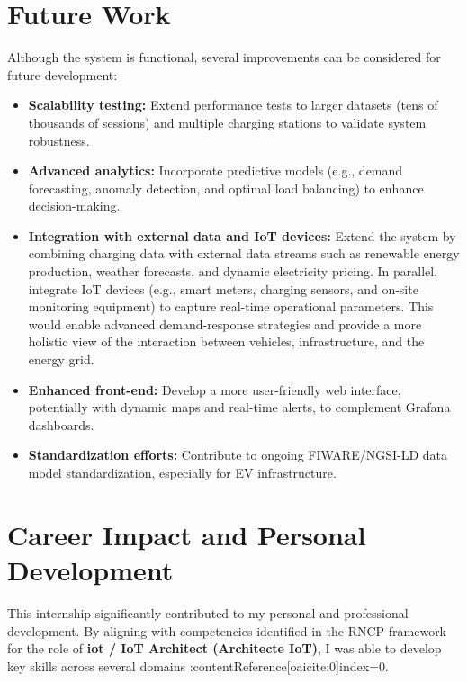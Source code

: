 \section{Future Work}
Although the system is functional, several improvements can be considered for future development:
\begin{itemize}
    \item \textbf{Scalability testing:} Extend performance tests to larger datasets (tens of thousands of sessions) and multiple charging stations to validate system robustness.
    \item \textbf{Advanced analytics:} Incorporate predictive models (e.g., demand forecasting, anomaly detection, and optimal load balancing) to enhance decision-making.
    \item \textbf{Integration with external data and IoT devices:} Extend the system by combining charging data with external data streams such as renewable energy production, weather forecasts, and dynamic electricity pricing. In parallel, integrate IoT devices (e.g., smart meters, charging sensors, and on-site monitoring equipment) to capture real-time operational parameters. This would enable advanced demand-response strategies and provide a more holistic view of the interaction between vehicles, infrastructure, and the energy grid.
    \item \textbf{Enhanced front-end:} Develop a more user-friendly web interface, potentially with dynamic maps and real-time alerts, to complement Grafana dashboards.
    \item \textbf{Standardization efforts:} Contribute to ongoing FIWARE/NGSI-LD data model standardization, especially for EV infrastructure.
\end{itemize}

\section{Career Impact and Personal Development}

This internship significantly contributed to my personal and professional development.  
By aligning with competencies identified in the RNCP framework for the role of \textbf{iot / IoT Architect (Architecte IoT)}, I was able to develop key skills across several domains :contentReference[oaicite:0]{index=0}.

